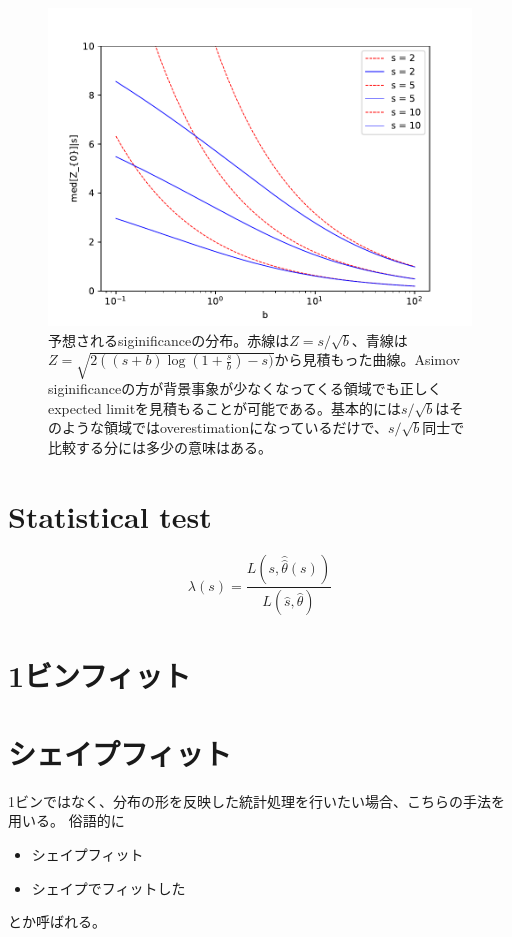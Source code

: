 \documentclass[uplatex]{jreport}
\begin{document}
\begin{figure}[h]
  \centering
  \includegraphics[scale=0.8]{python/discovery_significance.pdf}
  \caption{予想されるsiginificanceの分布。赤線は$Z=s/\sqrt{b}$、青線は$Z=\sqrt{2\left((s+b)\log\left({1+\frac{s}{b}}\right)-s)}$から見積もった曲線。Asimov siginificanceの方が背景事象が少なくなってくる領域でも正しくexpected limitを見積もることが可能である。基本的には$s/\sqrt{b}$はそのような領域ではoverestimationになっているだけで、$s/\sqrt{b}$同士で比較する分には多少の意味はある。}
\end{figure}


\section{Statistical test}

\begin{equation}
  \lambda(s) = \frac{L(s,\hat{\hat{\theta}}(s))}{L(\hat{s},\hat{\theta})}
\end{equation}

\section{1ビンフィット}



\section{シェイプフィット}
1ビンではなく、分布の形を反映した統計処理を行いたい場合、こちらの手法を用いる。
俗語的に
\begin{itemize}
  \item シェイプフィット
  \item シェイプでフィットした
\end{itemize}
とか呼ばれる。
\end{document}
